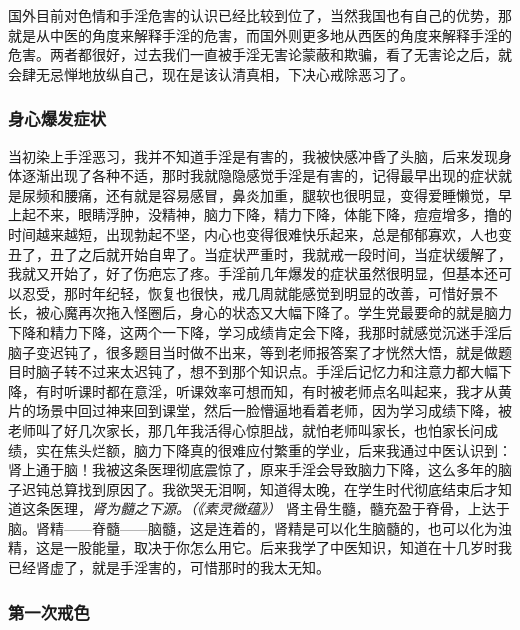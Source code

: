 国外目前对色情和手淫危害的认识已经比较到位了，当然我国也有自己的优势，那就是从中医的角度来解释手淫的危害，而国外则更多地从西医的角度来解释手淫的危害。两者都很好，过去我们一直被手淫无害论蒙蔽和欺骗，看了无害论之后，就会肆无忌惮地放纵自己，现在是该认清真相，下决心戒除恶习了。

\subsubsection{身心爆发症状}

当初染上手淫恶习，我并不知道手淫是有害的，我被快感冲昏了头脑，后来发现身体逐渐出现了各种不适，那时我就隐隐感觉手淫是有害的，记得最早出现的症状就是尿频和腰痛，还有就是容易感冒，鼻炎加重，腿软也很明显，变得爱睡懒觉，早上起不来，眼睛浮肿，没精神，脑力下降，精力下降，体能下降，痘痘增多，撸的时间越来越短，出现勃起不坚，内心也变得很难快乐起来，总是郁郁寡欢，人也变丑了，丑了之后就开始自卑了。当症状严重时，我就戒一段时间，当症状缓解了，我就又开始了，好了伤疤忘了疼。手淫前几年爆发的症状虽然很明显，但基本还可以忍受，那时年纪轻，恢复也很快，戒几周就能感觉到明显的改善，可惜好景不长，被心魔再次拖入怪圈后，身心的状态又大幅下降了。学生党最要命的就是脑力下降和精力下降，这两个一下降，学习成绩肯定会下降，我那时就感觉沉迷手淫后脑子变迟钝了，很多题目当时做不出来，等到老师报答案了才恍然大悟，就是做题目时脑子转不过来太迟钝了，想不到那个知识点。手淫后记忆力和注意力都大幅下降，有时听课时都在意淫，听课效率可想而知，有时被老师点名叫起来，我才从黄片的场景中回过神来回到课堂，然后一脸懵逼地看着老师，因为学习成绩下降，被老师叫了好几次家长，那几年我活得心惊胆战，就怕老师叫家长，也怕家长问成绩，实在焦头烂额，脑力下降真的很难应付繁重的学业，后来我通过中医认识到：肾上通于脑！我被这条医理彻底震惊了，原来手淫会导致脑力下降，这么多年的脑子迟钝总算找到原因了。我欲哭无泪啊，知道得太晚，在学生时代彻底结束后才知道这条医理，\textit{肾为髓之下源。（《素灵微蕴》）} 肾主骨生髓，髓充盈于脊骨，上达于脑。肾精——脊髓——脑髓，这是连着的，肾精是可以化生脑髓的，也可以化为浊精，这是一股能量，取决于你怎么用它。后来我学了中医知识，知道在十几岁时我已经肾虚了，就是手淫害的，可惜那时的我太无知。

\subsubsection{第一次戒色}

